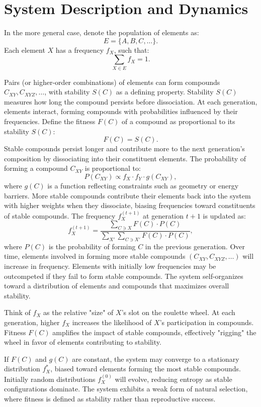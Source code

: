\documentclass[entropy,article,submit,pdftex,moreauthors]{Definitions/mdpi}
\begin{document}
\section{System Description and Dynamics}
In the more general case, denote the population of elements as:
\[
E = \{A, B, C, \dots\}.
\]
Each element \( X \) has a frequency \( f_X \), such that:
\[
\sum_{X \in E} f_X = 1.
\]

Pairs (or higher-order combinations) of elements can form compounds \( C_{XY}, C_{XYZ}, \dots \), with stability \( S(C) \) as a defining property. Stability \( S(C) \) measures how long the compound persists before dissociation. At each generation, elements interact, forming compounds with probabilities influenced by their frequencies. Define the fitness \( F(C) \) of a compound as proportional to its stability \( S(C) \):
\[
F(C) = S(C).
\]
Stable compounds persist longer and contribute more to the next generation's composition by dissociating into their constituent elements. The probability of forming a compound \( C_{XY} \) is proportional to:
\[
P(C_{XY}) \propto f_X \cdot f_Y \cdot g(C_{XY}),
\]
where \( g(C) \) is a function reflecting constraints such as geometry or energy barriers. More stable compounds contribute their elements back into the system with higher weights when they dissociate, biasing frequencies toward constituents of stable compounds. The frequency \( f_X^{(t+1)} \) at generation \( t+1 \) is updated as:
\begin{equation}
\label{eq1}
f_X^{(t+1)} = \frac{\sum_{C \ni X} F(C) \cdot P(C)}{\sum_{X'} \sum_{C \ni X'} F(C) \cdot P(C)},
\end{equation}
where \( P(C) \) is the probability of forming \( C \) in the previous generation. Over time, elements involved in forming more stable compounds \( (C_{XY}, C_{XYZ}, \dots) \) will increase in frequency. Elements with initially low frequencies may be outcompeted if they fail to form stable compounds. The system self-organizes toward a distribution of elements and compounds that maximizes overall stability.

Think of \( f_X \) as the relative "size" of \( X \)'s slot on the roulette wheel.
At each generation, higher \( f_X \) increases the likelihood of \( X \)'s participation in compounds. Fitness \( F(C) \) amplifies the impact of stable compounds, effectively "rigging" the wheel in favor of elements contributing to stability.

If \( F(C) \) and \( g(C) \) are constant, the system may converge to a stationary distribution \( f_X^* \), biased toward elements forming the most stable compounds. Initially random distributions \( f_X^{(0)} \) will evolve, reducing entropy as stable configurations dominate. The system exhibits a weak form of natural selection, where fitness is defined as stability rather than reproductive success.
\end{document}
